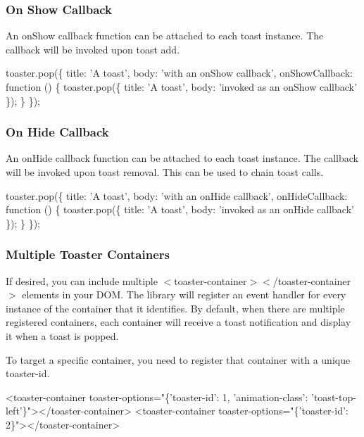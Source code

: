 \subsubsection*{On Show Callback}

An on\+Show callback function can be attached to each toast instance. The callback will be invoked upon toast add.


\begin{DoxyCode}
toaster.pop(\{
            title: 'A toast',
            body: 'with an onShow callback',
            onShowCallback: function () \{ 
                toaster.pop(\{
                    title: 'A toast',
                    body: 'invoked as an onShow callback'
                \});
            \}
\});
\end{DoxyCode}


\subsubsection*{On Hide Callback}

An on\+Hide callback function can be attached to each toast instance. The callback will be invoked upon toast removal. This can be used to chain toast calls.


\begin{DoxyCode}
toaster.pop(\{
            title: 'A toast',
            body: 'with an onHide callback',
            onHideCallback: function () \{ 
                toaster.pop(\{
                    title: 'A toast',
                    body: 'invoked as an onHide callback'
                \});
            \}
\});
\end{DoxyCode}


\subsubsection*{Multiple Toaster Containers}

If desired, you can include multiple {\ttfamily $<$toaster-\/container$>$$<$/toaster-\/container$>$} elements in your D\+OM. The library will register an event handler for every instance of the container that it identifies. By default, when there are multiple registered containers, each container will receive a toast notification and display it when a toast is popped.

To target a specific container, you need to register that container with a unique {\ttfamily toaster-\/id}.


\begin{DoxyCode}
<toaster-container toaster-options="\{'toaster-id': 1, 
    'animation-class': 'toast-top-left'\}"></toaster-container>
<toaster-container toaster-options="\{'toaster-id': 2\}"></toaster-container>
\end{DoxyCode}


